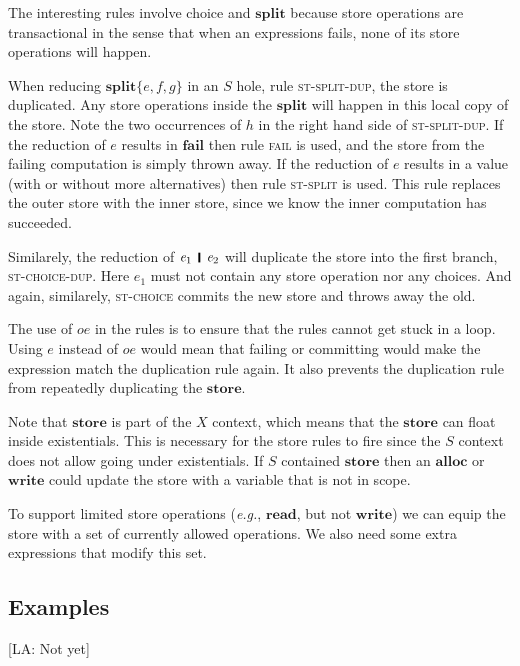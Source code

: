 \documentclass[acmsmall,review,dvipsnames]{acmart}
\newcommand{\Conid}[1]{\mathit{#1}}
\newcommand{\Varid}[1]{\mathit{#1}}
\newcommand{\eg}{\emph{e.g.}}
\newcommand{\rulename}[1]{\textsc{\small #1}}
\newcommand{\lennart}[1]{{\color{dkcyan} [{LA}: #1]}}
\newcommand{\lennart}[1]{}
\begin{document}
The interesting rules involve choice and \ensuremath{\textbf{split}} because store operations are transactional in the sense
that when an expressions fails, none of its store operations will happen.

When reducing \ensuremath{\textbf{split}\{\Varid{e},\Varid{f},\Varid{g}\}} in an \ensuremath{\Conid{S}} hole, rule \rulename{st-split-dup}, the store is duplicated.
Any store operations inside the \ensuremath{\textbf{split}} will happen in this local copy of the store.
Note the two occurrences of \ensuremath{\Varid{h}} in the right hand side of \rulename{st-split-dup}.
If the reduction of \ensuremath{\Varid{e}} results in \ensuremath{\textbf{fail}} then rule \rulename{fail} is used,
and the store from the failing computation is simply thrown away.
If the reduction of \ensuremath{\Varid{e}} results in a value (with or without more alternatives) then rule
\rulename{st-split} is used.  This rule replaces the outer store with the inner store,
since we know the inner computation has succeeded.

Similarely, the reduction of \ensuremath{\Varid{e}_{\mathrm{1}}\hspace{1mm}\mathop{\rule[-0.3mm]{0.5mm}{2.5mm}}\hspace{1mm}\Varid{e}_{\mathrm{2}}} will duplicate the store into the first branch, \rulename{st-choice-dup}.
Here \ensuremath{\Varid{e}_{\mathrm{1}}} must not contain any store operation nor any choices.
And again, similarely, \rulename{st-choice} commits the new store and throws away the old.

The use of \ensuremath{\Varid{oe}} in the rules is to ensure that the rules cannot get stuck in a loop.
Using \ensuremath{\Varid{e}} instead of \ensuremath{\Varid{oe}} would mean that failing or committing would make the expression match the duplication rule again.
It also prevents the duplication rule from repeatedly duplicating the \ensuremath{\textbf{store}}.

Note that \ensuremath{\textbf{store}} is part of the \ensuremath{X} context, which means that the \ensuremath{\textbf{store}} can float inside
existentials.
This is necessary for the store rules to fire since the \ensuremath{\Conid{S}} context does not allow
going under existentials.
If \ensuremath{\Conid{S}} contained \ensuremath{\textbf{store}} then an \ensuremath{\textbf{alloc}} or \ensuremath{\textbf{write}} could update the store with
a variable that is not in scope.

To support limited store operations ({\eg}, \ensuremath{\textbf{read}},
but not \ensuremath{\textbf{write}}) we can equip the store with a set of currently allowed operations.
We also need some extra expressions that modify this set.

\subsection{Examples}
\lennart{Not yet}
\end{document}
